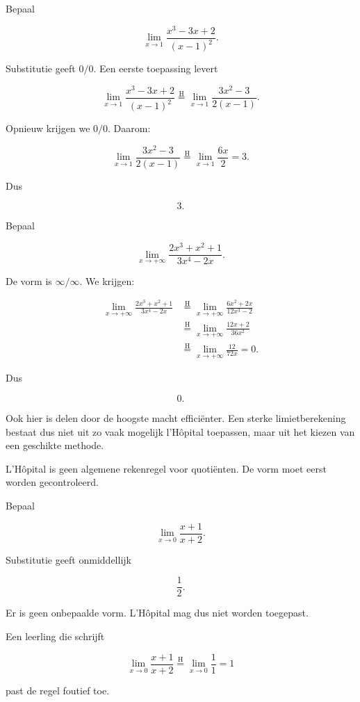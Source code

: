 \documentclass{ximera}
\begin{document}
\begin{voorbeeld}
Bepaal

\[\lim_{x\to1}\frac{x^3-3x+2}{(x-1)^2}.\]

Substitutie geeft \(0/0\). Een eerste toepassing levert

\[
\lim_{x\to1}\frac{x^3-3x+2}{(x-1)^2}
\overset{\mathrm H}{=}
\lim_{x\to1}\frac{3x^2-3}{2(x-1)}.
\]

Opnieuw krijgen we \(0/0\). Daarom:

\[
\lim_{x\to1}\frac{3x^2-3}{2(x-1)}
\overset{\mathrm H}{=}
\lim_{x\to1}\frac{6x}{2}
=3.
\]

Dus

\[\boxed{3}.\]
\end{voorbeeld}

\begin{voorbeeld}
Bepaal

\[\lim_{x\to+\infty}\frac{2x^3+x^2+1}{3x^4-2x}.\]

De vorm is \(\infty/\infty\). We krijgen:

\[
\begin{aligned}
\lim_{x\to+\infty}\frac{2x^3+x^2+1}{3x^4-2x}
&\overset{\mathrm H}{=}\lim_{x\to+\infty}\frac{6x^2+2x}{12x^3-2}\\
&\overset{\mathrm H}{=}\lim_{x\to+\infty}\frac{12x+2}{36x^2}\\
&\overset{\mathrm H}{=}\lim_{x\to+\infty}\frac{12}{72x}=0.
\end{aligned}
\]

Dus

\[\boxed{0}.\]

Ook hier is delen door de hoogste macht efficiënter. Een sterke
limietberekening bestaat dus niet uit zo vaak mogelijk l'Hôpital
toepassen, maar uit het kiezen van een geschikte methode.
\end{voorbeeld}



L'Hôpital is geen algemene rekenregel voor quotiënten. De vorm moet eerst
worden gecontroleerd.

\begin{voorbeeld}
Bepaal

\[\lim_{x\to0}\frac{x+1}{x+2}.\]

Substitutie geeft onmiddellijk

\[\frac12.\]

Er is geen onbepaalde vorm. L'Hôpital mag dus niet worden toegepast.

Een leerling die schrijft

\[
\lim_{x\to0}\frac{x+1}{x+2}
\overset{\mathrm H}{=}
\lim_{x\to0}\frac11=1
\]

past de regel foutief toe.
\end{voorbeeld}
\end{document}
